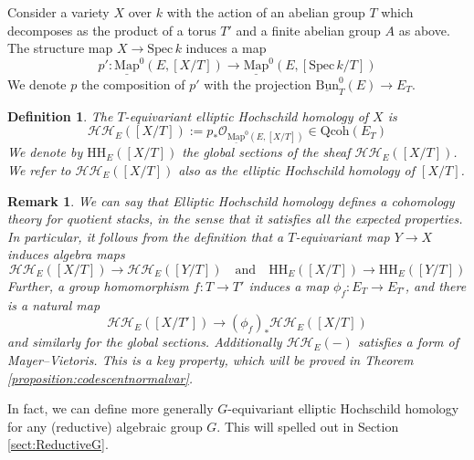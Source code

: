 \documentclass[11pt,letterpaper]{amsart}
\newtheorem{definition}[dummy]{Definition}
\newtheorem{remark}[dummy]{Remark}
\newcommand{\mHH}{\mathrm{HH}}
\newcommand{\cO}{\mathcal{O}}
\newcommand{\cHH}{\mathcal{HH}}
\newcommand{\Mapo}[2]{\underline{\mathrm{Map}}^{0}\left (#1,#2\right )}
\newcommand{\Spec}{\mathrm{S}\mathrm{pec}\,}
\newcommand{\Bun}{\underline{\mathrm{Bun}}}
\newcommand{\Qcoh}{\mathrm{Qcoh}}
\begin{document}
Consider a variety $X$ over $k$ with the action of an abelian group $T$ which decomposes as the product of a torus $T'$ and a finite abelian group $A$ as above. The structure map $X\rightarrow\Spec k$ induces a map
$$
p':\Mapo{E}{[X/T]}\rightarrow\Mapo{E}{[\Spec k /T]}
$$ 
We denote $p$ the composition of $p'$ with the projection $\Bun^0_T(E)\rightarrow E_T$.
\begin{definition}
\label{elliptichoch}
The $T$-\emph{equivariant elliptic Hochschild homology} of $X$ is 
$$\cHH_E([X/T]):=p_\ast\cO_{\Mapo{E}{[X/T]}} \in \Qcoh(E_T) $$
We denote by $\mathrm{HH}_E([X/T])$ the global sections of the sheaf $\cHH_E([X/T])$. We refer to $\cHH_E([X/T])$ also as the \emph{elliptic Hochschild homology} of $[X/T]$. 
\end{definition}

\begin{remark} We can say that Elliptic Hochschild homology  defines a cohomology theory for quotient stacks, in the sense that it satisfies all  the expected properties. In particular, it follows from the definition  that a $T$-equivariant map $Y \to X$ induces algebra maps
$$
\cHH_E([X/T]) \to \cHH_E([Y/T]) \quad \text{and} \quad 
 \mHH_E([X/T]) \to \mHH_E([Y/T])$$
Further, a group homomorphism $f:T\to T'$ induces a map $\phi_f:E_T\to E_{T'}$, and there is a natural map
\[
\cHH_E([X/T'])\to (\phi_f)_\ast\cHH_E([X/T])
\]
and similarly for the global sections.
Additionally $\cHH_E(-)$ satisfies a form of Mayer--Vietoris. This is a key property, which will be proved in Theorem \ref{proposition:codescentnormalvar}.
\end{remark}

In fact, we can define more generally $G$-equivariant elliptic Hochschild homology for any (reductive) algebraic group $G$. This will spelled out in Section  \ref{sect:ReductiveG}. 
\end{document}
